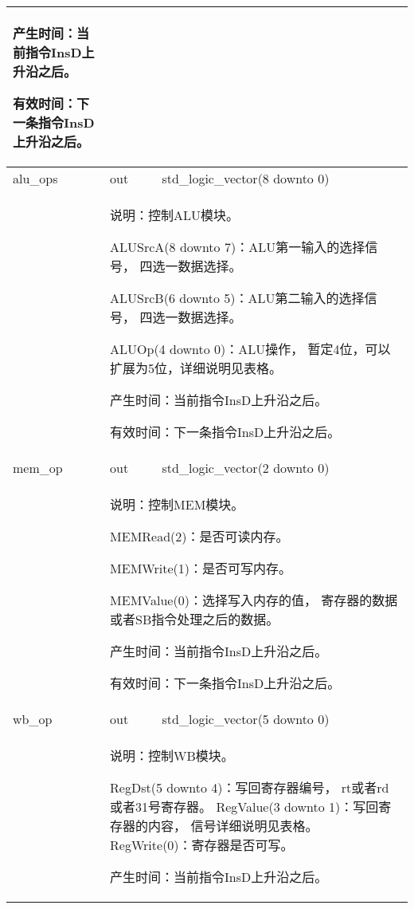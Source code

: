 \begin{tabularx}{\textwidth}{lll}
{                产生时间：当前指令InsD上升沿之后。

                有效时间：下一条指令InsD上升沿之后。 
            } \\
            \midrule
            alu\_ops        & out       & std\_logic\_vector(8 downto 0) \\
            \cmidrule(l){2-3}
            &
            \multicolumn{2}{X}{
                说明：控制ALU模块。

                ALUSrcA(8 downto 7)：ALU第一输入的选择信号，%
                四选一数据选择。

                ALUSrcB(6 downto 5)：ALU第二输入的选择信号，%
                四选一数据选择。

                ALUOp(4 downto 0)：ALU操作，%
                暂定4位，可以扩展为5位，详细说明见表格。

                产生时间：当前指令InsD上升沿之后。

                有效时间：下一条指令InsD上升沿之后。 
            } \\
            \midrule
            mem\_op         & out       & std\_logic\_vector(2 downto 0) \\
            \cmidrule(l){2-3}
            &
            \multicolumn{2}{X}{
                说明：控制MEM模块。

                MEMRead(2)：是否可读内存。

                MEMWrite(1)：是否可写内存。

                MEMValue(0)：选择写入内存的值，%
                寄存器的数据或者SB指令处理之后的数据。

                产生时间：当前指令InsD上升沿之后。

                有效时间：下一条指令InsD上升沿之后。
            } \\
            \midrule
            wb\_op          & out       & std\_logic\_vector(5 downto 0) \\
            \cmidrule(l){2-3}
            &
            \multicolumn{2}{X}{
                说明：控制WB模块。

                RegDst(5 downto 4)：写回寄存器编号，%
                            rt或者rd或者31号寄存器。
                RegValue(3 downto 1)：写回寄存器的内容，%
                                信号详细说明见表格。
                RegWrite(0)：寄存器是否可写。

                产生时间：当前指令InsD上升沿之后。

}
\end{tabularx}
